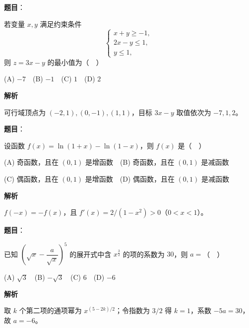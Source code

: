 \begin{answer}

\textbf{题目}：

若变量 \(x,y\) 满足约束条件
\nopagebreak[4]
\[
\begin{cases}
x+y\geqslant -1,\\
2x-y\leqslant 1,\\
y\leqslant 1,
\end{cases}
\]
则 \(z=3x-y\) 的最小值为（　）

(A) \(-7\)　(B) \(-1\)　(C) \(1\)　(D) \(2\)

\textbf{解析}

可行域顶点为 \((-2,1),(0,-1),(1,1)\)，目标 \(3x-y\) 取值依次为 \(-7,1,2\)。


\end{answer}
\begin{answer}

\textbf{题目}：

设函数 \(f(x)=\ln(1+x)-\ln(1-x)\)，则 \(f(x)\) 是（　）

(A) 奇函数，且在 \((0,1)\) 是增函数　(B) 奇函数，且在 \((0,1)\) 是减函数

(C) 偶函数，且在 \((0,1)\) 是增函数　(D) 偶函数，且在 \((0,1)\) 是减函数

\textbf{解析}

\(f(-x)=-f(x)\)，且 \(f'(x)=2/(1-x^2)>0\)（\(0<x<1\)）。


\end{answer}
\begin{answer}

\textbf{题目}：

已知 \(\left(\sqrt{x}-\dfrac{a}{\sqrt{x}}\right)^5\) 的展开式中含 \(x^{\frac32}\) 的项的系数为 \(30\)，则 \(a=\)（　）

(A) \(\sqrt3\)　(B) \(-\sqrt3\)　(C) \(6\)　(D) \(-6\)

\textbf{解析}

取 \(k\) 个第二项的通项幂为 \(x^{(5-2k)/2}\)；令指数为 \(3/2\) 得 \(k=1\)，系数 \(-5a=30\)，故 \(a=-6\)。


\end{answer}
